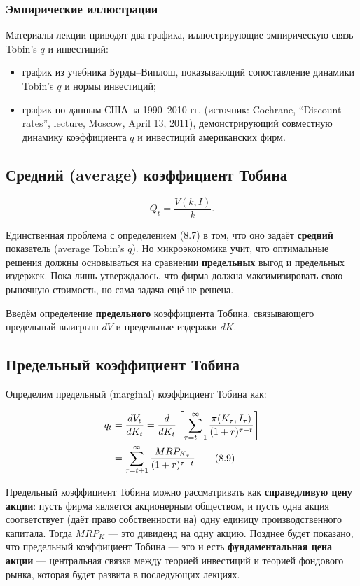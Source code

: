 \documentclass[10pt,a4paper]{article}
\begin{document}
\subsubsection{Эмпирические иллюстрации}

Материалы лекции приводят два графика, иллюстрирующие эмпирическую связь Tobin's $q$ и инвестиций:
\begin{itemize}[leftmargin=1.3em]
\item график из учебника Бурды--Виплош, показывающий сопоставление динамики Tobin's $q$ и нормы инвестиций;
\item график по данным США за 1990--2010 гг. (источник: Cochrane, ``Discount rates'', lecture, Moscow, April 13, 2011), демонстрирующий совместную динамику коэффициента $q$ и инвестиций американских фирм.
\end{itemize}

\subsection{Средний (average) коэффициент Тобина}

$$Q_t = \frac{V(k,I)}{k}.$$

Единственная проблема с определением (8.7) в том, что оно задаёт \textbf{средний} показатель (average Tobin's $q$). Но микроэкономика учит, что оптимальные решения должны основываться на сравнении \textbf{предельных} выгод и предельных издержек. Пока лишь утверждалось, что фирма должна максимизировать свою рыночную стоимость, но сама задача ещё не решена.

Введём определение \textbf{предельного} коэффициента Тобина, связывающего предельный выигрыш $dV$ и предельные издержки $dK$.

\subsection{Предельный коэффициент Тобина}

Определим предельный (marginal) коэффициент Тобина как:
\begin{formulabox}
\begin{align}
q_t &= \frac{dV_t}{dK_t} = \frac{d}{dK_t}\left[\sum_{\tau=t+1}^{\infty}\frac{\pi(K_\tau,I_\tau)}{(1+r)^{\tau-t}}\right] \notag\\
&= \sum_{\tau=t+1}^{\infty}\frac{MRP_{K_\tau}}{(1+r)^{\tau-t}} \tag{8.9}
\end{align}
\end{formulabox}

\begin{intuition}
Предельный коэффициент Тобина можно рассматривать как \textbf{справедливую цену акции}: пусть фирма является акционерным обществом, и пусть одна акция соответствует (даёт право собственности на) одну единицу производственного капитала. Тогда $MRP_K$ — это дивиденд на одну акцию. Позднее будет показано, что предельный коэффициент Тобина — это и есть \textbf{фундаментальная цена акции} — центральная связка между теорией инвестиций и теорией фондового рынка, которая будет развита в последующих лекциях.
\end{intuition}
\end{document}
